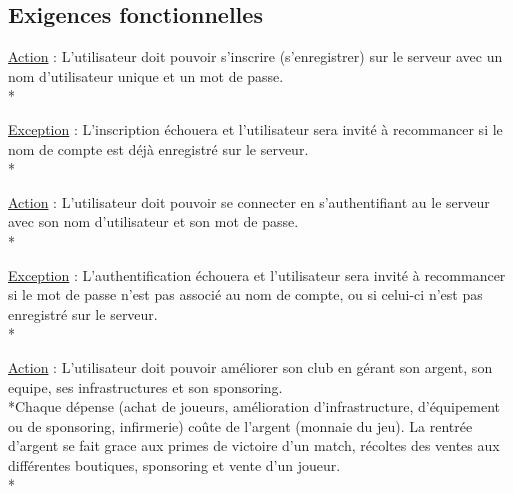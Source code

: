 \documentclass[a4paper]{article}
\begin{document}
	\subsection{Exigences fonctionnelles}
		\begin{description}[style=nextline]
			\item[Inscription :]
			\begin{description}[leftmargin=*] %
				\item[]
				\item \underline{Action} : L'utilisateur doit pouvoir s'inscrire (s'enregistrer) sur le serveur avec un nom d'utilisateur unique et un mot de passe.\\*
				\item \underline{Exception} : L'inscription échouera et l'utilisateur sera invité à recommancer si le nom de compte est déjà enregistré sur le serveur.\\*
			\end{description}
			\item[Connection :]
			\begin{description}[leftmargin=*] %
				\item[]
				\item \underline{Action} : L'utilisateur doit pouvoir se connecter en s'authentifiant au le serveur avec son nom d'utilisateur et son mot de passe.\\*
				\item \underline{Exception} : L'authentification échouera et l'utilisateur sera invité à recommancer si le mot de passe n'est pas associé au nom de compte, ou si celui-ci n'est pas enregistré sur le serveur.\\*
			\end{description}
			\item[Management :]
			\begin{description}[leftmargin=] %
				\item[]
				\item \underline{Action} : L'utilisateur doit pouvoir améliorer son \gls{club} en gérant son argent, son \gls{equipe}, ses infrastructures et son sponsoring.\\*Chaque dépense (achat de joueurs, amélioration d'infrastructure, d'équipement ou de sponsoring, infirmerie) coûte de l'argent (monnaie du jeu). La rentrée d'argent se fait grace aux primes de victoire d'un match, récoltes des ventes aux différentes boutiques, sponsoring et vente d'un joueur.\\*

\end{description}
\end{description}
\end{document}
